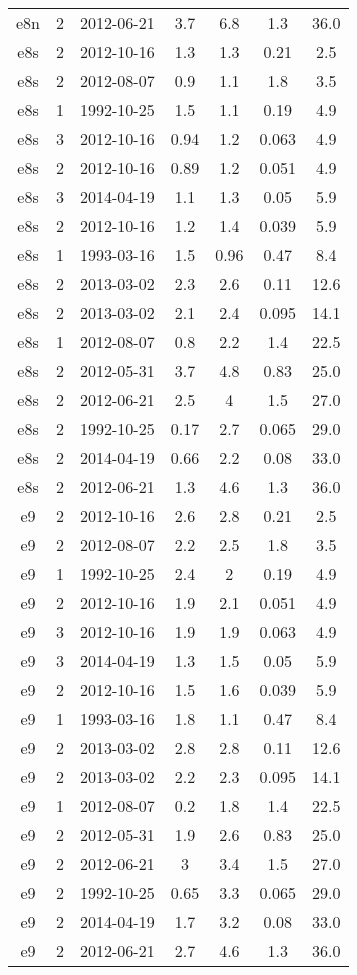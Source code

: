 \begin{table*}[htp]
\begin{tabular}{ccccccc}
e8n & 2 & 2012-06-21 & 3.7 & 6.8 & 1.3 & 36.0 \\
e8s & 2 & 2012-10-16 & 1.3 & 1.3 & 0.21 & 2.5 \\
e8s & 2 & 2012-08-07 & 0.9 & 1.1 & 1.8 & 3.5 \\
e8s & 1 & 1992-10-25 & 1.5 & 1.1 & 0.19 & 4.9 \\
e8s & 3 & 2012-10-16 & 0.94 & 1.2 & 0.063 & 4.9 \\
e8s & 2 & 2012-10-16 & 0.89 & 1.2 & 0.051 & 4.9 \\
e8s & 3 & 2014-04-19 & 1.1 & 1.3 & 0.05 & 5.9 \\
e8s & 2 & 2012-10-16 & 1.2 & 1.4 & 0.039 & 5.9 \\
e8s & 1 & 1993-03-16 & 1.5 & 0.96 & 0.47 & 8.4 \\
e8s & 2 & 2013-03-02 & 2.3 & 2.6 & 0.11 & 12.6 \\
e8s & 2 & 2013-03-02 & 2.1 & 2.4 & 0.095 & 14.1 \\
e8s & 1 & 2012-08-07 & 0.8 & 2.2 & 1.4 & 22.5 \\
e8s & 2 & 2012-05-31 & 3.7 & 4.8 & 0.83 & 25.0 \\
e8s & 2 & 2012-06-21 & 2.5 & 4 & 1.5 & 27.0 \\
e8s & 2 & 1992-10-25 & 0.17 & 2.7 & 0.065 & 29.0 \\
e8s & 2 & 2014-04-19 & 0.66 & 2.2 & 0.08 & 33.0 \\
e8s & 2 & 2012-06-21 & 1.3 & 4.6 & 1.3 & 36.0 \\
e9 & 2 & 2012-10-16 & 2.6 & 2.8 & 0.21 & 2.5 \\
e9 & 2 & 2012-08-07 & 2.2 & 2.5 & 1.8 & 3.5 \\
e9 & 1 & 1992-10-25 & 2.4 & 2 & 0.19 & 4.9 \\
e9 & 2 & 2012-10-16 & 1.9 & 2.1 & 0.051 & 4.9 \\
e9 & 3 & 2012-10-16 & 1.9 & 1.9 & 0.063 & 4.9 \\
e9 & 3 & 2014-04-19 & 1.3 & 1.5 & 0.05 & 5.9 \\
e9 & 2 & 2012-10-16 & 1.5 & 1.6 & 0.039 & 5.9 \\
e9 & 1 & 1993-03-16 & 1.8 & 1.1 & 0.47 & 8.4 \\
e9 & 2 & 2013-03-02 & 2.8 & 2.8 & 0.11 & 12.6 \\
e9 & 2 & 2013-03-02 & 2.2 & 2.3 & 0.095 & 14.1 \\
e9 & 1 & 2012-08-07 & 0.2 & 1.8 & 1.4 & 22.5 \\
e9 & 2 & 2012-05-31 & 1.9 & 2.6 & 0.83 & 25.0 \\
e9 & 2 & 2012-06-21 & 3 & 3.4 & 1.5 & 27.0 \\
e9 & 2 & 1992-10-25 & 0.65 & 3.3 & 0.065 & 29.0 \\
e9 & 2 & 2014-04-19 & 1.7 & 3.2 & 0.08 & 33.0 \\
e9 & 2 & 2012-06-21 & 2.7 & 4.6 & 1.3 & 36.0 \\
\hline
\end{tabular}

\end{table*}
